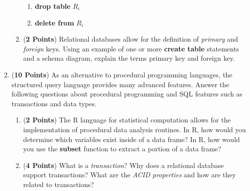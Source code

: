 \documentclass[12pt]{article}
\begin{document}
\begin{enumerate}
\begin{enumerate}
\begin{enumerate}
  \item {\bf drop table} $R_i$

  \item {\bf delete from} $R_i$

  \end{enumerate}

\item ({\bf 2 Points}) Relational databases allow for the definition of
  {\em primary} and {\em foreign} keys.  Using an example of one or
  more {\bf create table} statements and a schema diagram, explain the
  terms primary key and foreign key.


\end{enumerate}

\newpage

\item ({\bf 10 Points}) As an alternative to procedural programming
  languages, the structured query language provides many advanced
  features.  Answer the following questions about procedural
  programming and SQL features such as transactions and data types.

\begin{enumerate}

\item ({\bf 2 Points}) The R language for statistical computation
  allows for the implementation of procedural data analysis routines.
  In R, how would you determine which variables exist inside of a data
  frame?  In R, how would you use the {\bf subset} function to extract
  a portion of a data frame?


\item ({\bf 4 Points}) What is a {\em transaction}?  Why does a
  relational database support transactions?  What are the {\em ACID
    properties} and how are they related to transactions?


\end{enumerate}
\end{enumerate}
\end{document}
